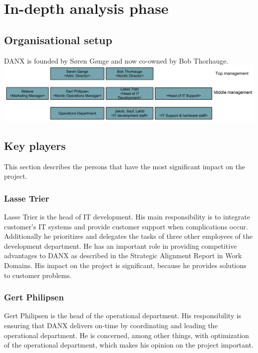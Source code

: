 \chapter{In-depth analysis phase}

\section{Organisational setup}
DANX is founded by Søren Gønge and now co-owned by Bob Thorhauge.\cite{malene002}\\
\includegraphics[scale=0.55]{img/Organizational_Chart}

\section{Key players}
This section describes the persons that have the most significant impact on the project.

\subsection{Lasse Trier}
Lasse Trier is the head of IT development. His main responsibility is to integrate customer’s IT systems and provide customer support when complications occur.\cite{lahib003}\cite{lahib004}\\
Additionally he prioritizes and delegates the tasks of three other employees of the development department.\cite{lasse009} He has an important role in providing competitive advantages to DANX as described in the Strategic Alignment Report in Work Domains. His impact on the project is significant, because he provides solutions to customer problems.

\subsection{Gert Philipsen}
Gert Philipsen is the head of the operational department. His responsibility is ensuring that DANX delivers on-time by coordinating and leading the operational department. He is concerned, among other things, with optimization of the operational department\cite{gert015}, which makes his opinion on the project important.

